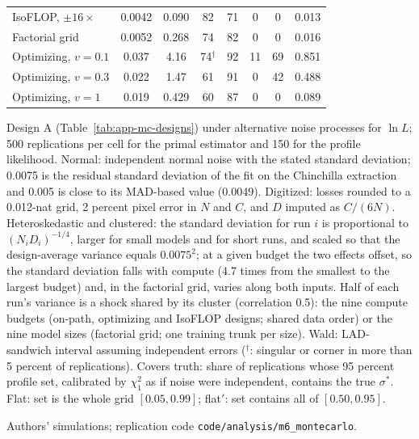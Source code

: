 \begin{table}[tp]
\begin{tabular}{@{}lccccccc@{}}
IsoFLOP, $\pm16\times$ & 0.0042 & 0.090 & 82 & 71 & 0 & 0 & 0.013 \\
Factorial grid & 0.0052 & 0.268 & 74 & 82 & 0 & 0 & 0.016 \\
Optimizing, $v=0.1$ & 0.037 & 4.16 & 74$^{\dagger}$ & 92 & 11 & 69 & 0.851 \\
Optimizing, $v=0.3$ & 0.022 & 1.47 & 61 & 91 & 0 & 42 & 0.488 \\
Optimizing, $v=1$ & 0.019 & 0.429 & 60 & 87 & 0 & 0 & 0.089 \\
\bottomrule
\end{tabular}
\par\smallskip
\begin{tablenotes}Design A (Table~\ref{tab:app-mc-designs}) under alternative noise processes for $\ln L$; 500 replications per cell for the primal estimator and 150 for the profile likelihood. Normal: independent normal noise with the stated standard deviation; 0.0075 is the residual standard deviation of the \citet{besiroglu2024chinchilla} fit on the Chinchilla extraction and 0.005 is close to its MAD-based value (0.0049). Digitized: losses rounded to a 0.012-nat grid, 2 percent pixel error in $N$ and $C$, and $D$ imputed as $C/(6N)$. Heteroskedastic and clustered: the standard deviation for run $i$ is proportional to $(N_iD_i)^{-1/4}$, larger for small models and for short runs, and scaled so that the design-average variance equals $0.0075^2$; at a given budget the two effects offset, so the standard deviation falls with compute (4.7 times from the smallest to the largest budget) and, in the factorial grid, varies along both inputs. Half of each run's variance is a shock shared by its cluster (correlation 0.5): the nine compute budgets (on-path, optimizing and IsoFLOP designs; shared data order) or the nine model sizes (factorial grid; one training trunk per size). Wald: LAD-sandwich interval assuming independent errors ($^{\dagger}$: singular or corner in more than 5 percent of replications). Covers truth: share of replications whose 95 percent profile set, calibrated by $\chi^2_1$ as if noise were independent, contains the true $\sigma^*$. Flat: set is the whole grid $[0.05,0.99]$; flat$'$: set contains all of $[0.50,0.95]$.\end{tablenotes}
\begin{tablenotes}[Source]Authors' simulations; replication code \texttt{code/analysis/m6\_montecarlo}.\end{tablenotes}
\end{table}

